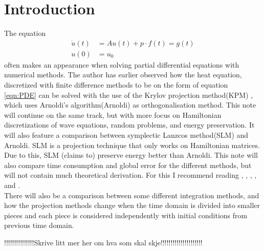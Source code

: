 \chapter{Introduction}

The equation 
\begin{equation} 
\begin{aligned}
\dot{u}(t) &= A u(t) + p \cdot f(t) = g(t) \\
u(0)&= u_0
\end{aligned}
\label{eqn:PDE}
\end{equation}
often makes an appearance when solving partial differential equations with numerical methods. The author has earlier observed how the heat equation, discretized with finite difference methods to be on the form of equation \eqref{eqn:PDE} can be solved with the use of the Krylov projection method(KPM) \cite{min}, which uses Arnoldi's algorithm(Arnoldi) as orthogonalisation method. This note will continue on the same track, but with more focus on Hamiltonian discretizations of wave equations, random problems, and energy preservation. It will also feature a comparison between symplectic Lanzcos method(SLM) \cite{SLM} and Arnoldi. SLM is a projection technique that only works on Hamiltonian matrices. Due to this, SLM (claims to) preserve energy better than Arnoldi. This note will also compare time consumption and global error for the different methods, but will not contain much theoretical derivation. For this I recommend reading \cite{elena}, \cite{min}, \cite{SLM}, \cite{SLMO}, and \cite{luli}. \\

There will also be a comparison between some different integration methods, and how the projection methods change when the time domain is divided into smaller pieces and each piece is considered independently with initial conditions from previous time domain.


!!!!!!!!!!!!!!!Skrive litt mer her om hva som skal skje!!!!!!!!!!!!!!!!!!!!!\\


